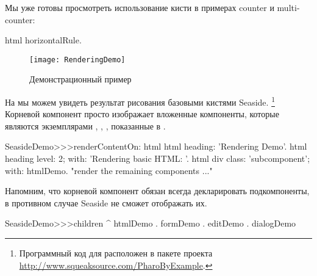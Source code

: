 \documentclass[a4paper,10pt,twoside]{book}
\begin{document}
Мы уже готовы просмотреть использование кисти в примерах counter и multi-counter:
\begin{code}{}
html horizontalRule.
\end{code}

\begin{figure}[ht]
\begin{center}
\texttt{[image: RenderingDemo]}
\caption{Демонстрационный пример}
\end{center}
\end{figure}


На  мы можем увидеть результат
рисования базовыми кистями Seaside.
\footnote{Программный код для  расположен в пакете
 проекта \url{http://www.squeaksource.com/PharoByExample}.}
Корневой компонент  просто изображает
вложенные компоненты,
которые являются экземплярами , ,
, показанные в .

\needspace{7ex}
\begin{method}[renderdemo]{}
SeasideDemo>>>renderContentOn: html
	html heading: 'Rendering Demo'.
	html heading
		level: 2;
		with: 'Rendering basic HTML: '.
	html div
		class: 'subcomponent';
		with: htmlDemo.
	"render the remaining components ..."
\end{method}

\noindent
Напомним,
что корневой компонент обязан всегда декларировать подкомпоненты,
в противном случае Seaside не сможет отображать их.


\begin{code}{}
SeasideDemo>>>children
	^ { htmlDemo . formDemo . editDemo . dialogDemo }
\end{code}

\end{document}
